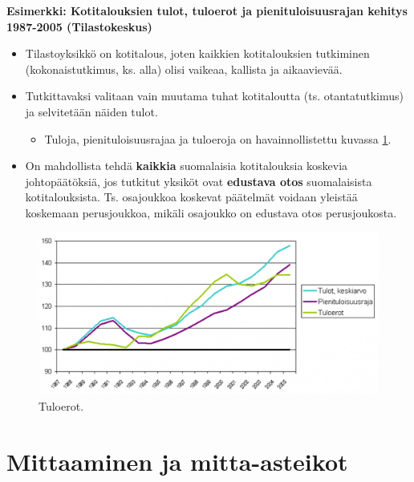 \documentclass[
]{book}
\providecommand{\tightlist}{%
  \setlength{\itemsep}{0pt}\setlength{\parskip}{0pt}}
\begin{document}
\begin{eblock}{}

\textbf{Esimerkki: Kotitalouksien tulot, tuloerot ja pienituloisuusrajan kehitys 1987-2005 (Tilastokeskus)}

\begin{itemize}
\tightlist
\item
  Tilastoyksikkö on kotitalous, joten kaikkien kotitalouksien tutkiminen (kokonaistutkimus, ks. alla) olisi vaikeaa, kallista ja aikaavievää.
\item
  Tutkittavaksi valitaan vain muutama tuhat kotitaloutta (ts. otantatutkimus) ja selvitetään näiden tulot.

  \begin{itemize}
  \tightlist
  \item
    Tuloja, pienituloisuusrajaa ja tuloeroja on havainnollistettu kuvassa \ref{fig:tuloerot}.
  \end{itemize}
\item
  On mahdollista tehdä \textbf{kaikkia} suomalaisia kotitalouksia koskevia johtopäätöksiä, jos tutkitut yksiköt ovat \textbf{edustava otos} suomalaisista kotitalouksista. Ts. osajoukkoa koskevat päätelmät voidaan yleistää koskemaan perusjoukkoa, mikäli osajoukko on edustava otos perusjoukosta.
\end{itemize}

\end{eblock}

\FloatBarrier

\begin{figure}

{\centering \includegraphics[width=1\linewidth]{images/tuloerot} 

}

\caption{Tuloerot.}\label{fig:tuloerot}
\end{figure}

\hypertarget{alaluku53}{%
\section{Mittaaminen ja mitta-asteikot}\label{alaluku53}}
\end{document}
